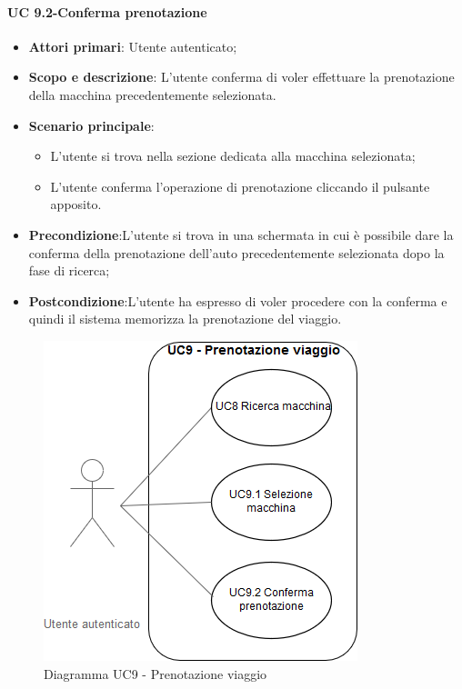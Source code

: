         \paragraph{UC 9.2-Conferma prenotazione}
            \begin{itemize}
                \item \textbf{Attori primari}: Utente autenticato;
                
                \item \textbf{Scopo e descrizione}: L'utente conferma di voler effettuare la prenotazione della macchina precedentemente selezionata. 
                \item \textbf{Scenario principale}:
                    \begin{itemize}
                        \item L'utente si trova nella sezione dedicata alla macchina selezionata;
                        \item L'utente conferma l'operazione di prenotazione cliccando il pulsante apposito.
                    \end{itemize}
                \item \textbf{Precondizione}:L'utente si trova in una schermata in cui è possibile dare la conferma della prenotazione dell'auto precedentemente selezionata dopo la fase di ricerca;
                \item \textbf{Postcondizione}:L’utente ha espresso di voler procedere con la conferma e quindi il sistema memorizza la prenotazione del viaggio.
            \end{itemize}
            
            \begin{figure}[h!]
           \begin{center}
           \includegraphics[scale=0.60]{immagini/9.png}    
           \caption{Diagramma UC9 - Prenotazione viaggio}
           \end{center}
            \end{figure}  
                  
